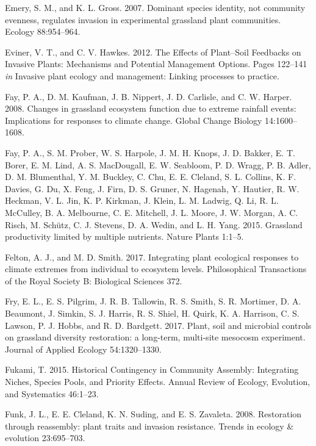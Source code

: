 \documentclass[twoside,12pt,final]{ucthesis-CA2012}
\begin{document}
\begin{ucmainmatter}
\leavevmode\hypertarget{ref-Emery2007}{}%
Emery, S. M., and K. L. Gross. 2007. Dominant species identity, not community evenness, regulates invasion in experimental grassland plant communities. Ecology 88:954--964.

\leavevmode\hypertarget{ref-Eviner2012}{}%
Eviner, V. T., and C. V. Hawkes. 2012. The Effects of Plant--Soil Feedbacks on Invasive Plants: Mechanisms and Potential Management Options. Pages 122--141 \emph{in} Invasive plant ecology and management: Linking processes to practice.

\leavevmode\hypertarget{ref-Fay2008}{}%
Fay, P. A., D. M. Kaufman, J. B. Nippert, J. D. Carlisle, and C. W. Harper. 2008. Changes in grassland ecosystem function due to extreme rainfall events: Implications for responses to climate change. Global Change Biology 14:1600--1608.

\leavevmode\hypertarget{ref-Fay2015}{}%
Fay, P. A., S. M. Prober, W. S. Harpole, J. M. H. Knops, J. D. Bakker, E. T. Borer, E. M. Lind, A. S. MacDougall, E. W. Seabloom, P. D. Wragg, P. B. Adler, D. M. Blumenthal, Y. M. Buckley, C. Chu, E. E. Cleland, S. L. Collins, K. F. Davies, G. Du, X. Feng, J. Firn, D. S. Gruner, N. Hagenah, Y. Hautier, R. W. Heckman, V. L. Jin, K. P. Kirkman, J. Klein, L. M. Ladwig, Q. Li, R. L. McCulley, B. A. Melbourne, C. E. Mitchell, J. L. Moore, J. W. Morgan, A. C. Risch, M. Schütz, C. J. Stevens, D. A. Wedin, and L. H. Yang. 2015. Grassland productivity limited by multiple nutrients. Nature Plants 1:1--5.

\leavevmode\hypertarget{ref-Felton2017}{}%
Felton, A. J., and M. D. Smith. 2017. Integrating plant ecological responses to climate extremes from individual to ecosystem levels. Philosophical Transactions of the Royal Society B: Biological Sciences 372.

\leavevmode\hypertarget{ref-Fry2017}{}%
Fry, E. L., E. S. Pilgrim, J. R. B. Tallowin, R. S. Smith, S. R. Mortimer, D. A. Beaumont, J. Simkin, S. J. Harris, R. S. Shiel, H. Quirk, K. A. Harrison, C. S. Lawson, P. J. Hobbs, and R. D. Bardgett. 2017. Plant, soil and microbial controls on grassland diversity restoration: a long-term, multi-site mesocosm experiment. Journal of Applied Ecology 54:1320--1330.

\leavevmode\hypertarget{ref-Fukami2015}{}%
Fukami, T. 2015. Historical Contingency in Community Assembly: Integrating Niches, Species Pools, and Priority Effects. Annual Review of Ecology, Evolution, and Systematics 46:1--23.

\leavevmode\hypertarget{ref-Funk2008}{}%
Funk, J. L., E. E. Cleland, K. N. Suding, and E. S. Zavaleta. 2008. Restoration through reassembly: plant traits and invasion resistance. Trends in ecology \& evolution 23:695--703.


\end{ucmainmatter}
\end{document}

